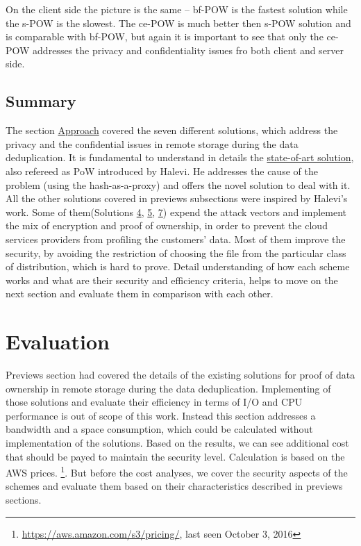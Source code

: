\documentclass[12pt]{article}
\begin{document}
On the client side the picture is the same -- bf-POW is the fastest solution while the s-POW is the slowest. The ce-POW is much better then s-POW solution and is comparable with bf-POW, but again it is important to see that only the ce-POW addresses the privacy and confidentiality issues fro both client and server side.


\subsection{Summary}
\label{subsub:ApproachSummary}

The section \hyperref[sec:4]{Approach} covered the seven different solutions, which address the privacy and the confidential issues in remote storage during the data deduplication. It is fundamental to understand in details  the \hyperref[sub:Soltuion1]{state-of-art solution}, also refereed as PoW introduced by Halevi. He addresses the cause of the problem (using the hash-as-a-proxy) and offers the novel solution to deal with it. All the other solutions covered in previews subsections were inspired by Halevi's work. Some of them(Solutions \hyperref[sub:Soltuion4]{4}, \hyperref[sub:Soltuion4]{5}, \hyperref[sub:Soltuion4]{7}) expend the  attack vectors and implement the mix of encryption and proof of ownership, in order to prevent the cloud services providers from profiling the customers' data. Most of them improve the security, by avoiding the restriction of choosing the file from the particular class of distribution, which is hard to prove. Detail understanding of how each scheme works and what are their security and efficiency criteria, helps to move on the next section and evaluate them in comparison with each other.  

\pagebreak

\section{Evaluation}
\label{sec:5}
Previews section had covered the details of the existing solutions for proof of data ownership in remote storage during the data deduplication. Implementing of those solutions and evaluate their efficiency in terms of I/O and CPU performance is out of scope of this work. Instead this section addresses a bandwidth and a space consumption, which could be calculated without implementation of the solutions. Based on the results, we can see additional cost that should be payed to maintain the security level. Calculation is  based on the AWS prices. \footnote{\url{https://aws.amazon.com/s3/pricing/}, last seen October 3, 2016}. But before the cost analyses, we cover the security aspects of the schemes and evaluate them based on their characteristics described in previews sections.
\end{document}
